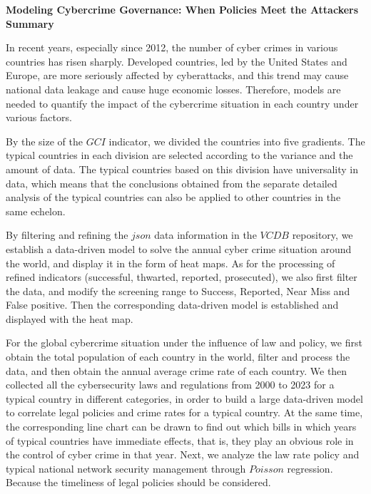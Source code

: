 \documentclass[12pt]{article}
\begin{document}
\begin{center}
	\fontsize{16}{19}\selectfont \textbf{Modeling Cybercrime Governance: When Policies Meet the Attackers} \\
	\bigskip
	\fontsize{16}{19}\selectfont \textbf{Summary} \\
\end{center}
\begin{adjustwidth}{2em}{2em}
	\hspace*{1.5em} In recent years, especially since 2012, the number of cyber crimes in various countries has risen sharply.
	Developed countries, led by the United States and Europe, are more seriously affected by cyberattacks,
	and this trend may cause national data leakage and cause huge economic losses.
	Therefore, models are needed to quantify the impact of the cybercrime situation in each country under various factors.

	By the size of the $GCI$ indicator, we divided the countries into five gradients.
	The typical countries in each division are selected according to the variance and the amount of data.
	The typical countries based on this division have universality in data,
	which means that the conclusions obtained from the separate detailed analysis of the typical countries can also be applied to other countries in the same echelon.

	By filtering and refining the $json$ data information in the $VCDB$ repository,
	we establish a data-driven model to solve the annual cyber crime situation around the world, and display it in the form of heat maps.
	As for the processing of refined indicators (successful, thwarted, reported, prosecuted),
	we also first filter the data, and modify the screening range to Success, Reported, Near Miss and False positive.
	Then the corresponding data-driven model is established and displayed with the heat map.

	For the global cybercrime situation under the influence of law and policy,
	we first obtain the total population of each country in the world, filter and process the data, and then obtain the annual average crime rate of each country.
	We then collected all the cybersecurity laws and regulations from 2000 to 2023 for a typical country in different categories,
	in order to build a large data-driven model to correlate legal policies and crime rates for a typical country.
	At the same time, the corresponding line chart can be drawn to find out which bills in which years of typical countries have immediate effects,
	that is, they play an obvious role in the control of cyber crime in that year.
	Next, we analyze the law rate policy and typical national network security management through $Poisson$ regression.
	Because the timeliness of legal policies should be considered.


\end{adjustwidth}
\end{document}
